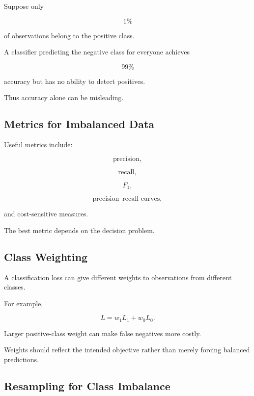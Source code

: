Suppose only

\[
1\%
\]

of observations belong to the positive class.

A classifier predicting the negative class for everyone achieves

\[
99\%
\]

accuracy but has no ability to detect positives.

Thus accuracy alone can be misleading.

\subsection{Metrics for Imbalanced Data}
\label{subsec:imbalanced-metrics}

Useful metrics include:

\[
\boxed{
\text{precision},
}
\]

\[
\boxed{
\text{recall},
}
\]

\[
\boxed{
F_1,
}
\]

\[
\boxed{
\text{precision--recall curves},
}
\]

and cost-sensitive measures.

The best metric depends on the decision problem.

\subsection{Class Weighting}
\label{subsec:class-weighting}

A classification loss can give different weights to observations from
different classes.

For example,

\[
\boxed{
L
=
w_1L_1
+
w_0L_0.
}
\]

Larger positive-class weight can make false negatives more costly.

Weights should reflect the intended objective rather than merely forcing
balanced predictions.

\subsection{Resampling for Class Imbalance}
\label{subsec:resampling-class-imbalance}

